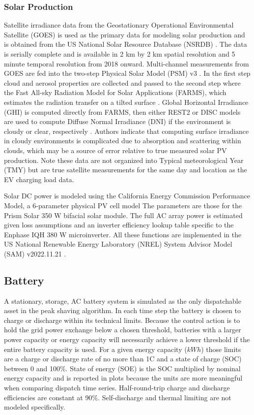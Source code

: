 \documentclass[journal,article,submit,pdftex,moreauthors]{Definitions/mdpi}
\begin{document}
\subsubsection{Solar Production}\label{solar-production}%

Satellite irradiance data from the Geostationary Operational Environmental Satellite (GOES) is used as the primary data for modeling solar production and is obtained from the US National Solar Resource Database (NSRDB) \cite{Sengupta2018}. The data is serially complete and is available in 2 km by 2 km spatial resolution and 5 minute temporal resolution from 2018 onward. Multi-channel measurements from GOES are fed into the two-step Physical Solar Model (PSM) v3  \cite{Sengupta2018}. In the first step cloud and aerosol properties are collected and passed to the second step where the Fast All-sky Radiation Model for Solar Applications (FARMS), which estimates the radiation transfer on a tilted surface \cite{Xie2016}. Global Horizontal Irradiance (GHI) is computed directly from FARMS, then either REST2 or DISC models are used to compute Diffuse Normal Irradiance (DNI) if the environment is cloudy or clear, respectively \cite{Xie2018}. Authors indicate that computing surface irradiance in cloudy environments is complicated due to absorption and scattering within clouds, which may be a source of error relative to true measured solar PV production. Note these data are not organized into Typical meteorological Year (TMY) but are true satellite measurements for the same day and location as the EV charging load data.

Solar DC power is modeled using the California Energy Commission Performance Model, a 6-parameter physical PV cell model The parameters are those for the Prism Solar 350 W bifacial solar module. The full AC array power is estimated given loss assumptions and an inverter efficiency lookup table specific to the Enphase IQH 380 W microinverter. All these functions are implemented in the US National Renewable Energy Laboratory (NREL) System Advisor Model (SAM) v2022.11.21 \cite{NREL2022}. 

\subsection{Battery}\label{battery}%

A stationary, storage, AC battery system is simulated as the only dispatchable asset in the peak shaving algorithm. In each time step the battery is chosen to charge or discharge within its technical limits. Because the control action is to hold the grid power exchange below a chosen threshold, batteries with a larger power capacity or energy capacity will necessarily achieve a lower threshold if the entire battery capacity is used. For a given energy capacity (\(kWh\)) those limits are a charge or discharge rate of no more than 1C and a state of charge (SOC) between 0 and 100\%. State of energy (SOE) is the SOC multiplied by nominal energy capacity and is reported in plots because the units are more meaningful when comparing dispatch time series. Half-round-trip charge and discharge efficiencies are constant at 90\%. Self-discharge and thermal limiting are not modeled specifically.
\end{document}
